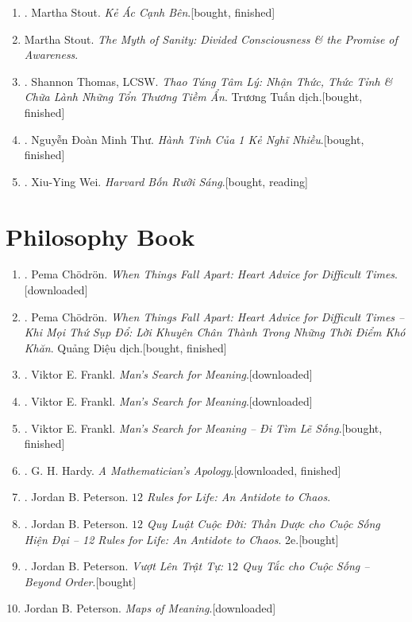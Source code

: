 \documentclass{article}
\begin{document}
\begin{enumerate}
	\item \cite{Stout2019}. Martha Stout. \textit{Kẻ Ác Cạnh Bên}.\hfill\textsf{[bought, finished]}	
	\item Martha Stout. \textit{The Myth of Sanity: Divided Consciousness \& the Promise of Awareness}.	
	\item \cite{Thomas2021}. Shannon Thomas, LCSW. \textit{Thao Túng Tâm Lý: Nhận Thức, Thức Tỉnh \& Chữa Lành Những Tổn Thương Tiềm Ẩn}. Trương Tuấn dịch.\hfill\textsf{[bought, finished]}
	\item \cite{Thu2022}. Nguyễn Đoàn Minh Thư. \textit{Hành Tinh Của 1  Kẻ Nghĩ Nhiều}.\hfill\textsf{[bought, finished]}
	\item \cite{Wei2022}. Xiu-Ying Wei. \textit{Harvard Bốn Rưỡi Sáng}.\hfill\textsf{[bought, reading]}
\end{enumerate}


\section{Philosophy Book}

\begin{enumerate}
	\item \cite{Chodron2002}. Pema Ch\"odr\"on. \textit{When Things Fall Apart: Heart Advice for Difficult Times}.\hfill\textsf{[downloaded]}
	\item \cite{Chodron2021}. Pema Ch\"odr\"on. \textit{When Things Fall Apart: Heart Advice for Difficult Times -- Khi Mọi Thứ Sụp Đổ: Lời Khuyên Chân Thành Trong Những Thời Điểm Khó Khăn}. Quảng Diệu dịch.\hfill\textsf{[bought, finished]}
	\item \cite{Frankl2013}. Viktor E. Frankl. \textit{Man's Search for Meaning}.\hfill\textsf{[downloaded]}
	\item \cite{Frankl2017}. Viktor E. Frankl. \textit{Man's Search for Meaning}.\hfill\textsf{[downloaded]}
	\item \cite{Frankl2022}. Viktor E. Frankl. \textit{Man's Search for Meaning -- Đi Tìm Lẽ Sống}.\hfill\textsf{[bought, finished]}
	\item \cite{Hardy1940, Hardy1992, Hardy2022}. G. H. Hardy. \textit{A Mathematician's Apology}.\hfill\textsf{[downloaded, finished]}
	\item \cite{Peterson2018}. Jordan B. Peterson. \textit{$12$ Rules for Life: An Antidote to Chaos}.
	\item \cite{Peterson2022a}. Jordan B. Peterson. \textit{$12$ Quy Luật Cuộc Đời: Thần Dược cho Cuộc Sống Hiện Đại -- 12 Rules for Life: An Antidote to Chaos}. 2e.\hfill\textsf{[bought]}
	\item \cite{Peterson2022b}. Jordan B. Peterson. \textit{Vượt Lên Trật Tự: $12$ Quy Tắc cho Cuộc Sống -- Beyond Order}.\hfill\textsf{[bought]}
	\item Jordan B. Peterson. \textit{Maps of Meaning}.\hfill\textsf{[downloaded]}
\end{enumerate}
\end{document}
